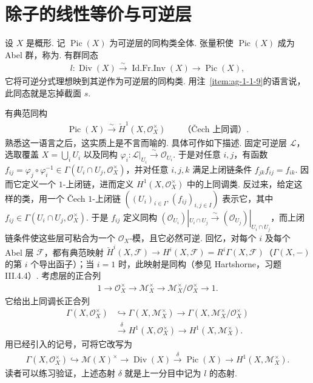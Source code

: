 \section{除子的线性等价与可逆层}\label{sec:ag-1-2}
\begin{numpara}[Picard 群]\label{item:ag-1-2-1}
设 $X$ 是概形. 记 $\operatorname{Pic}(X)$ 为可逆层的同构类全体. 张量积使 $\operatorname{Pic}(X)$ 成为 Abel 群，称为. 有群同态
\begin{align*}
l:\operatorname{Div}(X)\xrightarrow\sim\operatorname{Id.Fr.Inv}(X)\longrightarrow\operatorname{Pic}(X),
\end{align*}
它将可逆分式理想映到其逆作为可逆层的同构类. 用注~\ref{item:ag-1-1-9}的语言说，此同态就是忘掉截面 $s$.
\end{numpara}
\begin{numpara}[上同调解释]\label{item:ag-1-2-2}
有典范同构
\begin{align*}
\operatorname{Pic}(X)\xrightarrow\sim\check H^1(X,\mathcal O_X^\times)
\qquad\text{（\v Cech 上同调）}.
\end{align*}
熟悉这一语言之后，这实质上是不言而喻的. 具体可作如下描述. 固定可逆层 $\mathcal L$，选取覆盖 $X=\bigcup_iU_i$ 以及同构 $\varphi_i:\mathcal L|_{U_i}\xrightarrow\sim\mathcal O_{U_i}$. 于是对任意 $i,j$，有函数 $f_{ij}=\varphi_j\circ\varphi_i^{-1}\in\Gamma(U_i\cap U_j,\mathcal O_X^\times)$，并对任意 $i,j,k$ 满足上闭链条件 $f_{jk}f_{ij}=f_{ik}$. 因而它定义一个 $1$-上闭链，进而定义 $H^1(X,\mathcal O_X^\times)$ 中的上同调类. 反过来，给定这样的类，用一个 \v Cech $1$-上闭链 $((U_i)_{i\in I},(f_{ij})_{i,j\in I})$ 表示它，其中 $f_{ij}\in\Gamma(U_i\cap U_j,\mathcal O_X^\times)$. 于是 $f_{ij}$ 定义同构 $(\mathcal O_{U_i})|_{U_i\cap U_j}\xrightarrow\sim(\mathcal O_{U_j})|_{U_i\cap U_j}$，而上闭链条件使这些层可粘合为一个 $\mathcal O_X$-模，且它必然可逆.
回忆，对每个 $i$ 及每个 Abel 层 $\mathcal F$，都有典范映射 $\check H^i(X,\mathcal F)\longrightarrow H^i(X,\mathcal F)=R^i\Gamma(X,\mathcal F)$（$\Gamma(X,-)$ 的第 $i$ 个导出函子）；当 $i=1$ 时，此映射是同构（参见 Hartshorne，习题 III.4.4）. 考虑层的正合列
\begin{align*}
1\longrightarrow\mathcal O_X^\times\longrightarrow\mathcal M_X^\times
\longrightarrow\mathcal M_X^\times/\mathcal O_X^\times\longrightarrow1.
\end{align*}
它给出上同调长正合列
\begin{align*}
\Gamma(X,\mathcal O_X^\times)&\hookrightarrow\Gamma(X,\mathcal M_X^\times)
\longrightarrow\Gamma(X,\mathcal M_X^\times/\mathcal O_X^\times)\\
&\xrightarrow\delta H^1(X,\mathcal O_X^\times)\longrightarrow H^1(X,\mathcal M_X^\times).
\end{align*}
用已经引入的记号，可将它改写为
\begin{align*}
\Gamma(X,\mathcal O_X^\times)\hookrightarrow\mathcal M(X)^\times
\longrightarrow\operatorname{Div}(X)\xrightarrow\delta\operatorname{Pic}(X)
\longrightarrow H^1(X,\mathcal M_X^\times).
\end{align*}
读者可以练习验证，上述态射 $\delta$ 就是上一分目中记为 $l$ 的态射.
\end{numpara}
